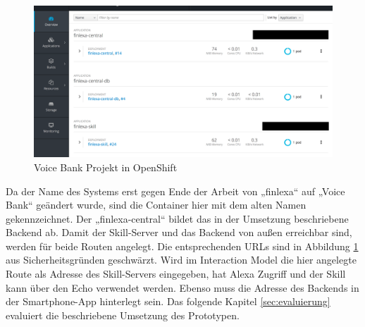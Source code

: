 \begin{figure}[!htb]
    \centering
    \includegraphics[width=1.0\textwidth]{bilder/4_openshift.png}
    \caption{Voice Bank Projekt in OpenShift}
    \label{fig:openshift}
\end{figure}

Da der Name des Systems erst gegen Ende der Arbeit von „finlexa“ auf „Voice Bank“ geändert wurde, sind die Container hier mit dem alten Namen gekennzeichnet. Der „finlexa-central“ bildet das in der Umsetzung beschriebene Backend ab. Damit der Skill-Server und das Backend von außen erreichbar sind, werden für beide Routen angelegt. Die entsprechenden \acp{URL} sind in Abbildung \ref{fig:openshift} aus Sicherheitsgründen geschwärzt. Wird im Interaction Model die hier angelegte Route als Adresse des Skill-Servers eingegeben, hat Alexa Zugriff und der Skill kann über den Echo verwendet werden. Ebenso muss die Adresse des Backends in der Smartphone-App hinterlegt sein. Das folgende Kapitel \ref{sec:evaluierung} evaluiert die beschriebene Umsetzung des Prototypen.

